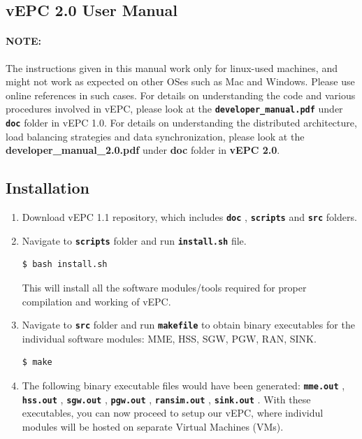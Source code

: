 \pdfminorversion=4\documentclass[hidelinks]{report}
\newcommand{\cf}[1] {
	\textbf{\texttt{#1}}
}
\begin{document}

\begin{center}
\section*{vEPC 2.0 User Manual}
\end{center}

\paragraph*{NOTE:}

The instructions given in this manual work only for linux-used machines, and might not work as expected on other OSes such as Mac and Windows. Please use online references in such cases. For details on understanding the code and various procedures involved in vEPC, please look at the \cf{developer\_manual.pdf} under \cf{doc} folder in vEPC 1.0. For details on understanding the distributed architecture, load balancing strategies and data synchronization, please look at the \textbf{developer\_manual\_2.0.pdf} under \textbf{doc} folder in \textbf{vEPC 2.0}.
\subsection*{Installation}

\begin{enumerate}

\item Download vEPC 1.1 repository, which includes \cf{doc}, \cf{scripts} and \cf{src} folders.

\item Navigate to \cf{scripts} folder and run \cf{install.sh} file.

\begin{lstlisting}[language=bash]
$ bash install.sh
\end{lstlisting}

This will install all the software modules/tools required for proper compilation and working of vEPC.

\item Navigate to \cf{src} folder and run \cf{makefile} to obtain binary executables for the individual software modules: MME, HSS, SGW, PGW, RAN, SINK.

\begin{lstlisting}[language=bash]
$ make
\end{lstlisting}

\item The following binary executable files would have been generated: \cf{mme.out}, \cf{hss.out}, \cf{sgw.out}, \cf{pgw.out}, \cf{ransim.out}, \cf{sink.out}. With these executables, you can now proceed to setup our vEPC, where individul modules will be hosted on separate Virtual Machines (VMs).

\end{enumerate}
\end{document}
